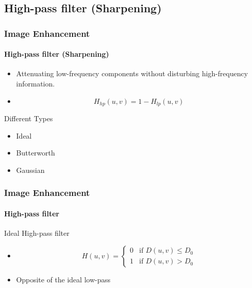 \documentclass{beamer}
\begin{document}
\subsection{High-pass filter (Sharpening)}
\begin{frame}
\frametitle{Image Enhancement}
\framesubtitle{High-pass filter (Sharpening)}
\begin{itemize}
	\item Attenuating low-frequency components without disturbing high-frequency information.
	\item [] $$H_{hp}(u,v) = 1 - H_{lp}(u,v)$$
\end{itemize}
\begin{block}{Different Types}
\begin{itemize}
	\item Ideal 
	\item Butterworth
	\item Gaussian
\end{itemize}
\end{block}
\end{frame}
\begin{frame}
\frametitle{Image Enhancement}
\framesubtitle{High-pass filter}
\begin{block}{Ideal High-pass filter}
\scriptsize{
\begin{itemize}
\item[] 	\[
 	H(u,v) = 
  	\begin{cases} 
   0 & \text{if } D(u,v) \leq D_{0} \\
   1 & \text{if } D(u,v) > D_{0}
  	\end{cases}
	\]
\item Opposite of the ideal low-pass\\
\end{itemize}
}
\end{block}
\end{frame}
\end{document}
